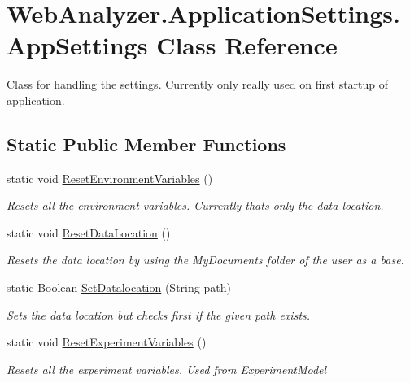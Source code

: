 \hypertarget{class_web_analyzer_1_1_application_settings_1_1_app_settings}{}\section{Web\+Analyzer.\+Application\+Settings.\+App\+Settings Class Reference}
\label{class_web_analyzer_1_1_application_settings_1_1_app_settings}


Class for handling the settings. Currently only really used on first startup of application.  


\subsection*{Static Public Member Functions}
\begin{DoxyCompactItemize}
\item 
static void \hyperlink{class_web_analyzer_1_1_application_settings_1_1_app_settings_a1f60a3d031a0fa24200c06415d11b3b6}{Reset\+Environment\+Variables} ()
\begin{DoxyCompactList}\small\item\em Resets all the environment variables. Currently thats only the data location. \end{DoxyCompactList}\item 
static void \hyperlink{class_web_analyzer_1_1_application_settings_1_1_app_settings_aeb29103a92e6fbf8bd6be79de2294099}{Reset\+Data\+Location} ()
\begin{DoxyCompactList}\small\item\em Resets the data location by using the My\+Documents folder of the user as a base. \end{DoxyCompactList}\item 
static Boolean \hyperlink{class_web_analyzer_1_1_application_settings_1_1_app_settings_a3c885c79ecd2a5c3a47acfa26576101a}{Set\+Datalocation} (String path)
\begin{DoxyCompactList}\small\item\em Sets the data location but checks first if the given path exists. \end{DoxyCompactList}\item 
static void \hyperlink{class_web_analyzer_1_1_application_settings_1_1_app_settings_a9514437749c644ae28ea615cab4cb758}{Reset\+Experiment\+Variables} ()
\begin{DoxyCompactList}\small\item\em Resets all the experiment variables. Used from Experiment\+Model \end{DoxyCompactList}\end{DoxyCompactItemize}


